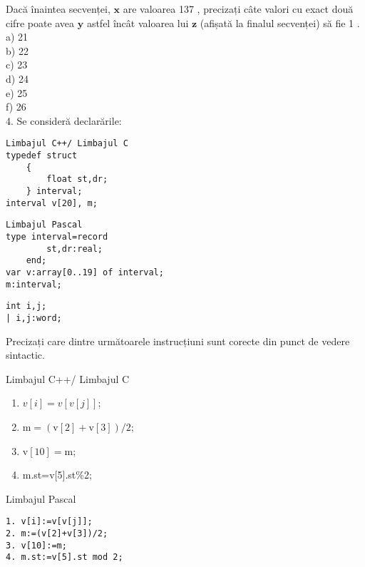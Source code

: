 Dacă înaintea secvenței, $\mathbf{x}$ are valoarea 137 , precizați câte valori cu exact două cifre poate avea $\mathbf{y}$ astfel încât valoarea lui $\mathbf{z}$ (afișată la finalul secvenței) să fie 1 .\\
a) 21\\
b) 22\\
c) 23\\
d) 24\\
e) 25\\
f) 26\\
4. Se consideră declarările:

\begin{verbatim}
Limbajul C++/ Limbajul C
typedef struct
    {
        float st,dr;
    } interval;
interval v[20], m;
\end{verbatim}

\begin{verbatim}
Limbajul Pascal
type interval=record
        st,dr:real;
    end;
var v:array[0..19] of interval;
m:interval;
\end{verbatim}

\begin{verbatim}
int i,j;
| i,j:word;
\end{verbatim}

Precizați care dintre următoarele instrucțiuni sunt corecte din punct de vedere sintactic.

Limbajul C++/ Limbajul C

\begin{enumerate}
  \item $v[i]=v[v[j]]$;
  \item $\mathrm{m}=(\mathrm{v}[2]+\mathrm{v}[3]) / 2$;
  \item $\mathrm{v}[10]=\mathrm{m}$;
  \item m.st=v[5].st\%2;
\end{enumerate}

Limbajul Pascal

\begin{verbatim}
1. v[i]:=v[v[j]];
2. m:=(v[2]+v[3])/2;
3. v[10]:=m;
4. m.st:=v[5].st mod 2;
\end{verbatim}

